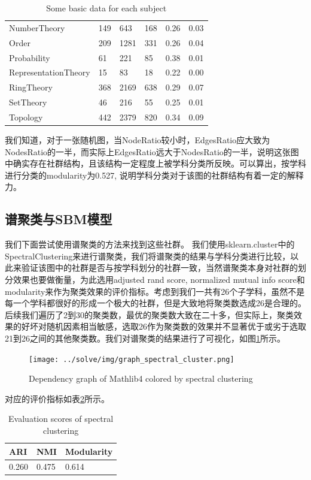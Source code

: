 \begin{table}[h!]
\begin{tabular}{llllll}
    NumberTheory & 149 & 643 & 168 & 0.26 & 0.03\\
    Order & 209 & 1281 & 331 & 0.26 & 0.04\\
    Probability & 61 & 221 & 85 & 0.38 & 0.01\\
    RepresentationTheory & 15 & 83 & 18 & 0.22 & 0.00\\
    RingTheory & 368 & 2169 & 638 & 0.29 & 0.07\\
    SetTheory & 46 & 216 & 55 & 0.25 & 0.01\\
    Topology& 442 & 2379 & 820 & 0.34 & 0.09\\
    \bottomrule
\end{tabular}
\caption{Some basic data for each subject}
\label{tab:Ratio}
\end{table}

我们知道，对于一张随机图，当NodeRatio较小时，EdgesRatio应大致为NodesRatio的一半，而实际上EdgesRatio远大于NodesRatio的一半，说明这张图中确实存在社群结构，且该结构一定程度上被学科分类所反映。可以算出，按学科进行分类的modularity为0.527, 说明学科分类对于该图的社群结构有着一定的解释力。

\subsection{谱聚类与SBM模型}

我们下面尝试使用谱聚类的方法来找到这些社群。
我们使用sklearn.cluster中的SpectralClustering来进行谱聚类，我们将谱聚类的结果与学科分类进行比较，以此来验证该图中的社群是否与按学科划分的社群一致，当然谱聚类本身对社群的划分效果也要做衡量，为此选用adjusted rand score, normalized mutual info score和modularity来作为聚类效果的评价指标。考虑到我们一共有26个子学科，虽然不是每一个学科都很好的形成一个极大的社群，但是大致地将聚类数选成26是合理的。后续我们遍历了2到30的聚类数，最优的聚类数大致在二十多，但实际上，聚类效果的好坏对随机因素相当敏感，选取26作为聚类数的效果并不显著优于或劣于选取21到26之间的其他聚类数。我们对谱聚类的结果进行了可视化，如图\ref{fig:clustering}所示。

\begin{figure}[h!]
    \centering
    \texttt{[image: ../solve/img/graph\_spectral\_cluster.png]}
    \caption{Dependency graph of Mathlib4 colored by spectral clustering}
    \label{fig:clustering}
\end{figure}

对应的评价指标如表\ref{tab:score}所示。
\begin{table}[h!]
  \centering
  \begin{tabular}{lll}
    \toprule
    ARI & NMI & Modularity\\
    \midrule
    0.260 & 0.475 & 0.614\\
    \bottomrule
  \end{tabular}
  \caption{Evaluation scores of spectral clustering}
  \label{tab:score}
\end{table}

